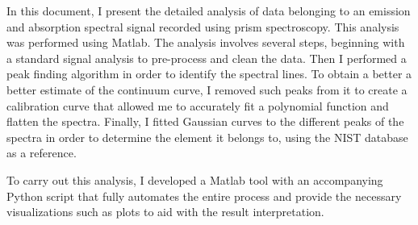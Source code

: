 In this document, I present the detailed analysis of data belonging to an emission and absorption spectral signal recorded using prism spectroscopy. This analysis was performed using Matlab. The analysis involves
several steps, beginning with a standard signal analysis to pre-process and clean the data. Then I performed a peak finding algorithm in order to identify the spectral lines. To obtain a better a better estimate of the continuum curve, I removed such peaks from it to create a calibration curve that allowed me to accurately fit a polynomial function and flatten the spectra.
Finally, I fitted Gaussian curves to the different peaks of the spectra in order to determine the element it belongs to, using the NIST database as a reference.

To carry out this analysis, I developed a Matlab tool with an accompanying Python script that fully automates the entire process and provide the necessary visualizations such as plots to aid with the result interpretation. 